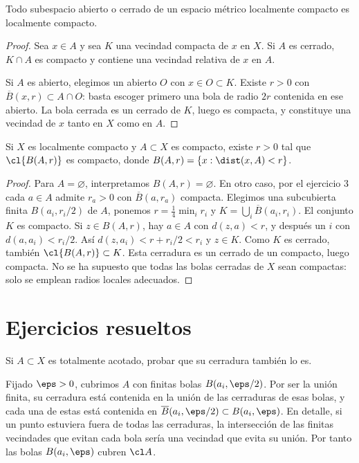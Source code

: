 \begin{proposicion}\label{ch15:subespacios}
Todo subespacio abierto o cerrado de un espacio métrico localmente compacto es localmente compacto.
\end{proposicion}
\begin{proof}
Sea $x\in A$ y sea $K$ una vecindad compacta de $x$ en $X$. Si $A$ es cerrado, $K\cap A$ es compacto y contiene una vecindad relativa de $x$ en $A$.

Si $A$ es abierto, elegimos un abierto $O$ con $x\in O\subset K$. Existe $r>0$ con $\overline B(x,r)\subset A\cap O$: basta escoger primero una bola de radio $2r$ contenida en ese abierto. La bola cerrada es un cerrado de $K$, luego es compacta, y constituye una vecindad de $x$ tanto en $X$ como en $A$.
\end{proof}

\begin{proposicion}\label{ch15:engrosamiento}
Si $X$ es localmente compacto y $A\subset X$ es compacto, existe $r>0$ tal que $\cl{B(A,r)}$ es compacto, donde $B(A,r)=\{x:\dist(x,A)<r\}$.
\end{proposicion}
\begin{proof}
Para $A=\varnothing$, interpretamos $B(A,r)=\varnothing$. En otro caso, por el ejercicio 3 cada $a\in A$ admite $r_a>0$ con $\overline B(a,r_a)$ compacta. Elegimos una subcubierta finita $B(a_i,r_i/2)$ de $A$, ponemos $r=\frac14\min_i r_i$ y $K=\bigcup_i\overline B(a_i,r_i)$. El conjunto $K$ es compacto. Si $z\in B(A,r)$, hay $a\in A$ con $d(z,a)<r$, y después un $i$ con $d(a,a_i)<r_i/2$. Así $d(z,a_i)<r+r_i/2<r_i$ y $z\in K$. Como $K$ es cerrado, también $\cl{B(A,r)}\subset K$. Esta cerradura es un cerrado de un compacto, luego compacta. No se ha supuesto que todas las bolas cerradas de $X$ sean compactas: solo se emplean radios locales adecuados.
\end{proof}

\section{Ejercicios resueltos}
\begin{ejercicio}
Si $A\subset X$ es totalmente acotado, probar que su cerradura también lo es.
\end{ejercicio}
\begin{solucion}
Fijado $\eps>0$, cubrimos $A$ con finitas bolas $B(a_i,\eps/2)$. Por ser la unión finita, su cerradura está contenida en la unión de las cerraduras de esas bolas, y cada una de estas está contenida en $\overline B(a_i,\eps/2)\subset B(a_i,\eps)$. En detalle, si un punto estuviera fuera de todas las cerraduras, la intersección de las finitas vecindades que evitan cada bola sería una vecindad que evita su unión. Por tanto las bolas $B(a_i,\eps)$ cubren $\cl A$.
\end{solucion}

